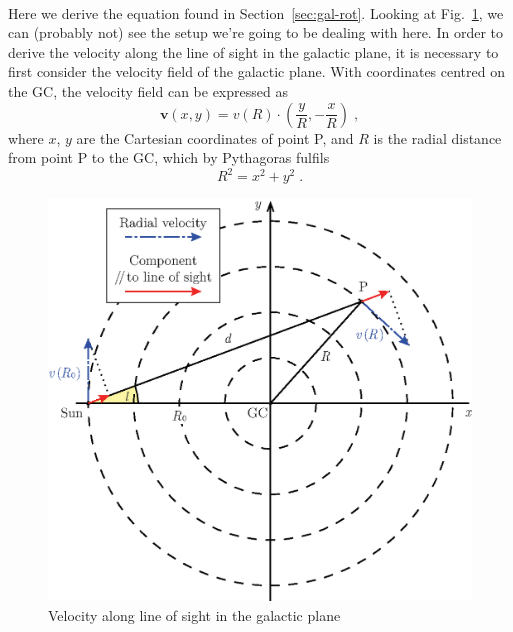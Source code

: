 \documentclass[a4paper, titlepage, oneside]{article}
\begin{document}
\paragraph{}
Here we derive the equation found in Section~\ref{sec:gal-rot}. Looking at Fig.~\ref{fig:doppler}, we can (probably not) see the setup we're going to be dealing with here. In order to derive the velocity along the line of sight in the galactic plane, it is necessary to first consider the velocity field of the galactic plane. With coordinates centred on the GC, the velocity field can be expressed as
\begin{equation}
  \label{eq:vel-field}
  \mathbf{v}(x,y)=v(R)\cdot\!\left(\frac{y}{R},-\frac{x}{R}\right)\;,
\end{equation}
where \(x\), \(y\) are the Cartesian coordinates of point P, and \(R\) is the radial distance from point P to the GC, which by Pythagoras fulfils
\begin{equation}
  R^2=x^2+y^2\;.
\end{equation}

\begin{figure}[h]
  \centering
  \includegraphics[width=13cm]{figures/doppler-shift}
  \caption{Velocity along line of sight in the galactic plane}
  \label{fig:doppler}
\end{figure}
\end{document}
